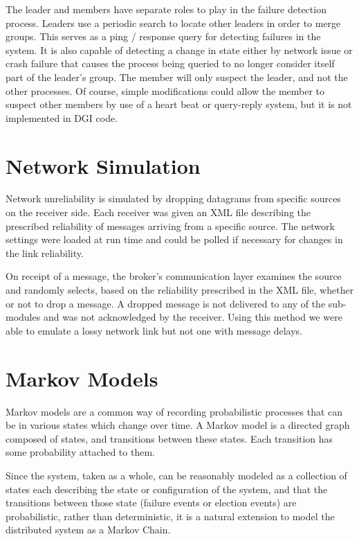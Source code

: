 The leader and members have separate roles to play in the failure detection process. Leaders use a periodic search to locate other leaders in order to merge groups. This serves as a ping / response query for detecting failures in the system. It is also capable of detecting a change in state either by network issue or crash failure that causes the process being queried to no longer consider itself part of the leader's group. The member will only suspect the leader, and not the other processes.
Of course, simple modifications could allow the member to suspect other members by use of a heart beat or query-reply system, but it is not implemented in DGI code.

\section{Network Simulation}

Network unreliability is simulated by dropping datagrams from specific sources on the receiver side. Each receiver was given an XML file describing the prescribed reliability of messages arriving from a specific source. The network settings were loaded at run time and could be polled if necessary for changes in the link reliability.

On receipt of a message, the broker's communication layer examines the source and randomly selects, based on the reliability prescribed in the XML file, whether or not to drop a message. A dropped message is not delivered to any of the sub-modules and was not acknowledged by the receiver. Using this method we were able to emulate a lossy network link but not one with message delays.

\section{Markov Models}

Markov models are a common way of recording probabilistic processes that can be in various states which change over time. A Markov model is a directed graph composed of states, and transitions between these states. Each transition has some probability attached to them.

Since the system, taken as a whole, can be reasonably modeled as a collection of states each describing the state or configuration of the system, and that the transitions between those state (failure events or election events) are probabilistic, rather than deterministic, it is a natural extension to model the distributed system as a Markov Chain.

